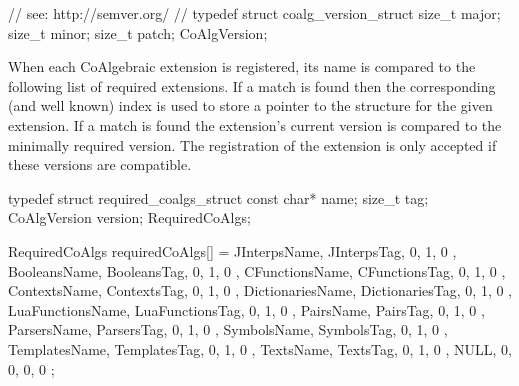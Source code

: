 \startCHeader
// see: http://semver.org/
//
typedef struct coalg_version_struct {
  size_t major;
  size_t minor;
  size_t patch;
} CoAlgVersion;
\stopCHeader

When each CoAlgebraic extension is registered, its name is compared to the 
following list of required extensions. If a match is found then the 
corresponding (and well known) index is used to store a pointer to the 
 structure for the given extension. If a match is found 
the extension's current version is compared to the minimally required 
version. The registration of the extension is only accepted if these 
versions are compatible. 

\startCCode
typedef struct required_coalgs_struct {
  const char*  name;
  size_t       tag;
  CoAlgVersion version;
} RequiredCoAlgs;

RequiredCoAlgs requiredCoAlgs[] = {
  { JInterpsName,     JInterpsTag,     {0, 1, 0 }},
  { BooleansName,     BooleansTag,     {0, 1, 0 }},
  { CFunctionsName,   CFunctionsTag,   {0, 1, 0 }},
  { ContextsName,     ContextsTag,     {0, 1, 0 }},
  { DictionariesName, DictionariesTag, {0, 1, 0 }},
  { LuaFunctionsName, LuaFunctionsTag, {0, 1, 0 }},
  { PairsName,        PairsTag,        {0, 1, 0 }},
  { ParsersName,      ParsersTag,      {0, 1, 0 }},
  { SymbolsName,      SymbolsTag,      {0, 1, 0 }},
  { TemplatesName,    TemplatesTag,    {0, 1, 0 }},
  { TextsName,        TextsTag,        {0, 1, 0 }},
  { NULL,             0,               {0, 0, 0 }}
};
\stopCCode
